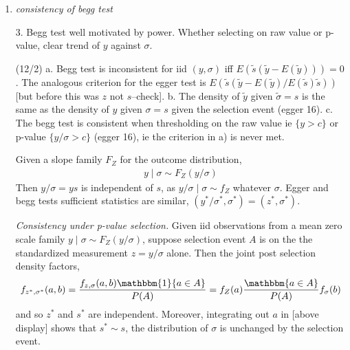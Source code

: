 \documentclass{article}
\renewcommand{\t}[1]{\tilde{#1}}
\renewcommand{\P}{P}
\newcommand{\sel}[1]{#1^*}
\begin{document}
\begin{enumerate}
  (12/5) 1. The sufficienct for inconsistency of egger's test with
  thresholding on the raw value is, for some $s$,
  $0=u'(s)=\frac{d}{ds}\frac{(1-F_Z(cs))^\alpha}{\int_{cs}^{\infty}(1-F_Z(z))dz}$
  where $\alpha=cE(S)/E(\mu_c(s))$ is $\le 1$. The monotonicity condition is probably
  sufficient as well, in the sense that there is a nondegenerate distribution
  of $s=1/\sigma$, such that $E(Su(S))=0$ if $u'(s)=0$ for some $s$.

  2. From the monotonicity condition $u'(s)>0$ or $u'(s)<0$, gronwall's
  condition gives necessary conditions that must be satisfied in order
  that egger's test be consistent for raw thresholding.


  4. For distributions of $S$ with a mean given by $c,m$, $u'(s)=0$ on
  an interval when the outcome distribution follows a power law with
  exponent $m$ and thresholding on the raw value at $c$. This seems to
  be the only type of distribution where $u'(s)$ vanishes on the
  interval, by solving the diff eq. (egger 16). But the criterion for
  inconsistency can be met without $u$ vanishing on an interval.



\item \emph{consistency of begg test}

  3. Begg test well motivated by power. Whether selecting on raw value
  or p-value, clear trend of $y$ against $\sigma$.


  (12/2) a. Begg test is inconsistent for iid $(y,\sigma)$ iff
  $E(\t{s}(\t{y}-E(\t{y})))=0$. The analogous criterion for the egger
  test is $E(\t{s}(\t{y}-E(\t{y})/E(\t{s})\t{s}))$ [but before this was
  $z$ not $s$--check].  b. The density of $\tilde{y}$ given
  $\t{\sigma}=s$ is the same as the density of $y$ given $\sigma=s$
  given the selection event (egger 16). c. The begg test is consistent
  when thresholding on the raw value ie $\{y>c\}$ or p-value
  $\{y/\sigma>c\}$ (egger 16), ie the criterion in a) is never met.

  Given a slope family $F_Z$ for the outcome distribution,
  \begin{align}
    y\mid\sigma \sim F_Z(y/\sigma)
  \end{align}
  Then $y/\sigma=ys$ is independent of $s$, as
  $y/\sigma \mid \sigma \sim f_Z$ whatever $\sigma$. Egger and begg
  tests sufficient statistics are similar,
  $(\sel y/\sel \sigma,\sel \sigma)=(\sel z,\sel\sigma)$.

  \emph{Consistency under p-value selection.} Given iid observations
  from a mean zero scale family $y\mid\sigma \sim F_Z(y/\sigma)$, suppose
  selection event $A$ is on the the standardized measurement
  $z=y/\sigma$ alone. Then the joint post selection density factors,
  \begin{align}
    f_{\sel z,\sel\sigma}(a,b)=\frac{f_{z,\sigma}(a,b)\mathbbm{1}\{a\in A\}}{\P(A)}=f_Z(a)\frac{\mathbbm\{a\in A\}}{\P(A)}f_{\sigma}(b)
  \end{align}
  and so $\sel z$ and $\sel s$ are independent. Moreover, integrating
  out $a$ in [above display] shows that $\sel s \sim s$, the
  distribution of $\sigma$ is unchanged by the selection event.


\end{enumerate}
\end{document}
